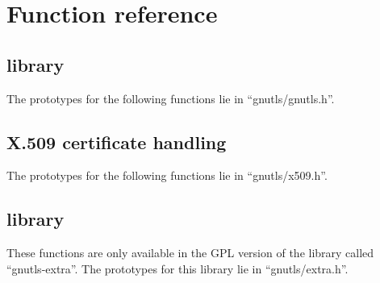 \chapter{Function reference}

\section{\gnutls{} library}
The prototypes for the following functions lie
in ``gnutls/gnutls.h''.


\newpage

\section{\gnutls{} X.509 certificate handling}
\label{sec:x509api}
The prototypes for the following functions lie
in ``gnutls/x509.h''.




\newpage


\section{\gnutlse{} library}
These functions are only available in the GPL version of the
library called ``gnutls-extra''. The prototypes for this library lie
in ``gnutls/extra.h''.



